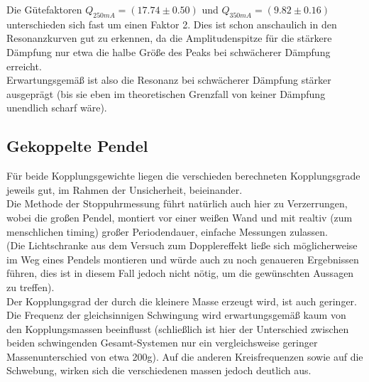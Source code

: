 \documentclass[12pt,a4paper]{article}
\begin{document}
\begin{multicols}{2}
Die Gütefaktoren $Q_{250mA}=(17.74 \pm 0.50)$ und $Q_{350mA}=(9.82 \pm 0.16)$ unterschieden sich fast um einen Faktor 2. Dies ist schon anschaulich in den Resonanzkurven gut zu erkennen, da die Amplitudenspitze für die stärkere Dämpfung nur etwa die halbe Größe des Peaks bei schwächerer Dämpfung erreicht.\\
Erwartungsgemäß ist also die Resonanz bei schwächerer Dämpfung stärker ausgeprägt (bis sie eben im theoretischen Grenzfall von keiner Dämpfung unendlich scharf wäre).\\


\subsection{Gekoppelte Pendel}
\noindent Für beide Kopplungsgewichte liegen die verschieden berechneten Kopplungsgrade jeweils gut, im Rahmen der Unsicherheit, beieinander.\\
Die Methode der Stoppuhrmessung führt natürlich auch hier zu Verzerrungen, wobei die großen Pendel, montiert vor einer weißen Wand und mit realtiv (zum menschlichen timing) großer Periodendauer, einfache Messungen zulassen.\\
(Die Lichtschranke aus dem Versuch zum Dopplereffekt ließe sich möglicherweise im Weg eines Pendels montieren und würde auch zu noch genaueren Ergebnissen führen, dies ist in diesem Fall jedoch nicht nötig, um die gewünschten Aussagen zu treffen).\\

Der Kopplungsgrad der durch die kleinere Masse erzeugt wird, ist auch geringer.\\
Die Frequenz der gleichsinnigen Schwingung wird erwartungsgemäß kaum von den Kopplungsmassen beeinflusst (schließlich ist hier der Unterschied zwischen beiden schwingenden Gesamt-Systemen nur ein vergleichsweise geringer Massenunterschied von etwa 200g). Auf die anderen Kreisfrequenzen sowie auf die Schwebung, wirken sich die verschiedenen massen jedoch deutlich aus.\\



\end{multicols}
\end{document}
